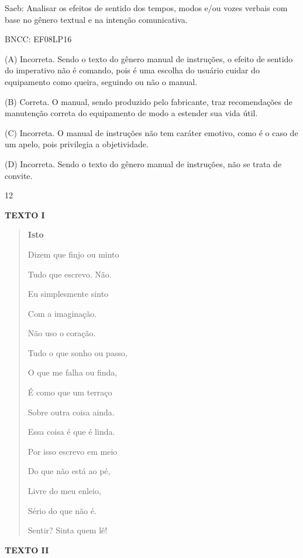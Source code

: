 Saeb: Analisar os efeitos de sentido dos tempos, modos e/ou vozes
verbais com base no gênero textual e na intenção comunicativa.

BNCC: EF08LP16

(A) Incorreta. Sendo o texto do gênero manual de instruções, o efeito de
sentido do imperativo não é comando, pois é uma escolha do usuário
cuidar do equipamento como queira, seguindo ou não o manual.

(B) Correta. O manual, sendo produzido pelo fabricante, traz
recomendações de manutenção correta do equipamento de modo a estender
sua vida útil.

(C) Incorreta. O manual de instruções não tem caráter emotivo, como é o
caso de um apelo, pois privilegia a objetividade.

(D) Incorreta. Sendo o texto do gênero manual de instruções, não se
trata de convite.

\num{12}

\textbf{TEXTO I}

\begin{quote}

\textbf{Isto}

Dizem que finjo ou minto

Tudo que escrevo. Não.

Eu simplesmente sinto

Com a imaginação.

Não uso o coração.

Tudo o que sonho ou passo,

O que me falha ou finda,

É como que um terraço

Sobre outra coisa ainda.

Essa coisa é que é linda.

Por isso escrevo em meio

Do que não está ao pé,

Livre do meu enleio,

Sério do que não é.

Sentir? Sinta quem lê!
\end{quote}


\textbf{TEXTO II}

